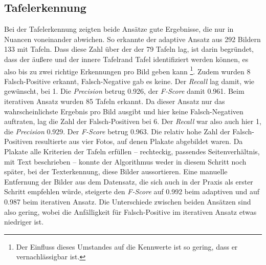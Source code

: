\subsection{Tafelerkennung}
Bei der Tafelerkennung zeigten beide Ansätze gute Ergebnisse, die nur in Nuancen voneinander abwichen.
So erkannte der adaptive Ansatz aus 292 Bildern 133 mit Tafeln. Dass diese Zahl über der der 79 Tafeln lag, ist darin begründet, dass der äußere und der innere Tafelrand Tafel identifiziert werden können, es also bis zu zwei richtige Erkennungen pro Bild geben kann \footnote{Der Einfluss dieses Umstandes auf die Kennwerte ist so gering, dass er vernachlässigbar ist.}. Zudem wurden 8 Falsch-Positive erkannt, Falsch-Negative gab es keine. Der \textit{Recall} lag damit, wie gewünscht, bei 1. Die \textit{Precision} betrug 0.926, der \textit{F-Score} damit 0.961.
Beim iterativen Ansatz wurden 85 Tafeln erkannt. Da dieser Ansatz nur das wahrscheinlichste Ergebnis pro Bild ausgibt und hier keine Falsch-Negativen auftraten, lag die Zahl der Falsch-Positiven bei 6. Der \textit{Recall} war also auch hier 1, die \textit{Precision} 0.929. Der \textit{F-Score} betrug 0.963.
Die relativ hohe Zahl der Falsch-Positiven resultierte aus vier Fotos, auf denen Plakate abgebildet waren. Da Plakate alle Kriterien der Tafeln erfüllen -- rechteckig, passendes Seitenverhältnis, mit Text beschrieben -- konnte der Algorithmus weder in diesem Schritt noch später, bei der Texterkennung, diese Bilder aussortieren. Eine manuelle Entfernung der Bilder aus dem Datensatz, die sich auch in der Praxis als erster Schritt empfehlen würde, steigerte den \textit{F-Score} auf 0.992 beim adaptiven und auf 0.987 beim iterativen Ansatz. Die Unterschiede zwischen beiden Ansätzen sind also gering, wobei die Anfälligkeit für Falsch-Positive im iterativen Ansatz etwas niedriger ist. 


